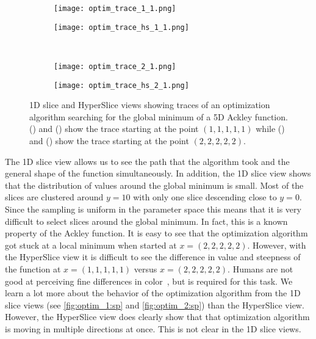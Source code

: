 \begin{figure}
  \centering
  \begin{subfigure}[b]{0.35\linewidth}
    \texttt{[image: optim\_trace\_1\_1.png]}
    \subcaption{ 
      \label{fig:optim_1:sp}
    }
  \end{subfigure}
  \qquad\qquad
  \begin{subfigure}[b]{0.35\linewidth}
    \texttt{[image: optim\_trace\_hs\_1\_1.png]}
    \subcaption{
      \label{fig:optim_1:hs}
    }
  \end{subfigure}
  \\
  \begin{subfigure}[b]{0.35\linewidth}
    \texttt{[image: optim\_trace\_2\_1.png]}
    \subcaption{
      \label{fig:optim_2:sp}
    }
  \end{subfigure}
  \qquad\qquad
  \begin{subfigure}[b]{0.35\linewidth}
    \texttt{[image: optim\_trace\_hs\_2\_1.png]}
    \subcaption{
      \label{fig:optim_2:hs}
    }
  \end{subfigure}
  \caption[1D slice and HyperSlice views of optimization algorithm traces]{%
    1D slice and HyperSlice views showing
    traces of an optimization algorithm searching for the global minimum
    of a 5D Ackley function.
    () and 
    () show the trace starting at the point
    $(1,1,1,1,1)$ while 
    () and 
    () 
    show the trace starting at the point $(2,2,2,2,2)$. 
  }
  \label{fig:optim_trace}
\end{figure}

The 1D slice view allows us to see the path that the algorithm took and the
general shape of the function simultaneously.  In addition, the 1D slice view
shows that the distribution of values around the global minimum is small. Most
of the slices are clustered around \(y=10\) with only one slice descending
close to \(y=0\). Since the sampling is uniform in the parameter space this
means that it is very difficult to select slices around the global minimum. In
fact, this is a known property of the Ackley function.  It is easy to see that
the optimization algorithm got stuck at a local minimum when started at
\(x=(2,2,2,2,2)\). However, with the HyperSlice view it is difficult to see the
difference in value and steepness of the function at \(x=(1,1,1,1,1)\) versus
\(x=(2,2,2,2,2)\).  Humans are not good at perceiving fine differences in
color~\cite{Munzner:2014}, but is required for this task. We learn a lot more
about the behavior of the optimization algorithm from the 1D slice views (see
\autoref{fig:optim_1:sp} and \autoref{fig:optim_2:sp}) than the HyperSlice
view. However, the HyperSlice view does clearly show that that optimization
algorithm is moving in multiple directions at once. This is not clear in the 1D
slice views.


